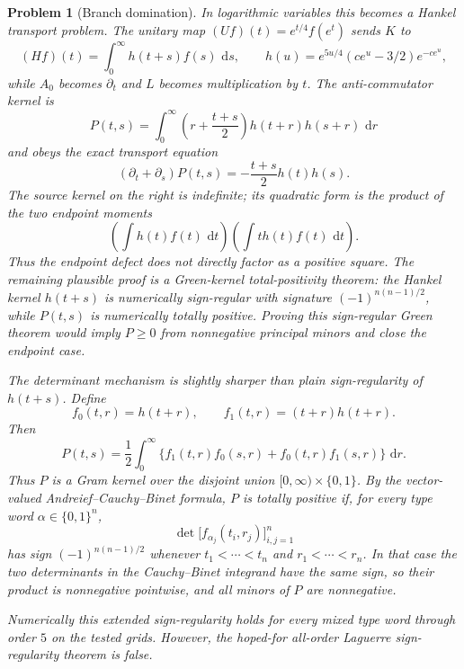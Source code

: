 \documentclass[11pt]{article}
\newtheorem{problem}[theorem]{Problem}
\newcommand{\dd}{\,\mathrm d}
\begin{document}
\begin{problem}[Branch domination]
In logarithmic variables this becomes a Hankel transport problem.  The unitary
map $(Uf)(t)=e^{t/4}f(e^t)$ sends $K$ to
\[
  (Hf)(t)=\int_0^\infty h(t+s)f(s)\,\dd s,\qquad
  h(u)=e^{5u/4}(ce^u-3/2)e^{-ce^u},
\]
while $A_0$ becomes $\partial_t$ and $L$ becomes multiplication by $t$.  The
anti-commutator kernel is
\[
  P(t,s)=\int_0^\infty
  \left(r+\frac{t+s}{2}\right)h(t+r)h(s+r)\,\dd r
\]
and obeys the exact transport equation
\[
  (\partial_t+\partial_s)P(t,s)
  =
  -\frac{t+s}{2}h(t)h(s).
\]
The source kernel on the right is indefinite; its quadratic form is the product
of the two endpoint moments
\[
  \left(\int h(t)f(t)\,\dd t\right)
  \left(\int th(t)f(t)\,\dd t\right).
\]
Thus the endpoint defect does not directly factor as a positive square.  The
remaining plausible proof is a Green-kernel total-positivity theorem: the
Hankel kernel $h(t+s)$ is numerically sign-regular with signature
$(-1)^{n(n-1)/2}$, while $P(t,s)$ is numerically totally positive.  Proving
this sign-regular Green theorem would imply $P\ge0$ from nonnegative principal
minors and close the endpoint case.

The determinant mechanism is slightly sharper than plain sign-regularity of
$h(t+s)$.  Define
\[
  f_0(t,r)=h(t+r),\qquad f_1(t,r)=(t+r)h(t+r).
\]
Then
\[
  P(t,s)=\frac12\int_0^\infty
  \{f_1(t,r)f_0(s,r)+f_0(t,r)f_1(s,r)\}\,\dd r .
\]
Thus $P$ is a Gram kernel over the disjoint union
$[0,\infty)\times\{0,1\}$.  By the vector-valued Andreief--Cauchy--Binet
formula, $P$ is totally positive if, for every type word
$\alpha\in\{0,1\}^n$,
\[
  \det\bigl[f_{\alpha_j}(t_i,r_j)\bigr]_{i,j=1}^n
\]
has sign $(-1)^{n(n-1)/2}$ whenever
$t_1<\cdots<t_n$ and $r_1<\cdots<r_n$.  In that case the two determinants in
the Cauchy--Binet integrand have the same sign, so their product is
nonnegative pointwise, and all minors of $P$ are nonnegative.

Numerically this extended sign-regularity holds for every mixed type word
through order $5$ on the tested grids.  However, the hoped-for all-order
Laguerre sign-regularity theorem is false.


\end{problem}
\end{document}
